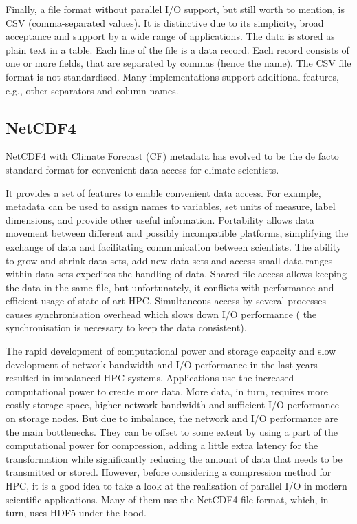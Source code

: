 Finally, a file format without parallel I/O support, but still worth to mention, is CSV (comma-separated values).
It is distinctive due to its simplicity, broad acceptance and support by a wide range of applications.
The data is stored as plain text in a table.
Each line of the file is a data record.
Each record consists of one or more fields, that are separated by commas (hence the name).
The CSV file format is not standardised.
Many implementations support additional features, e.g., other separators and column names.



\subsection{NetCDF4}

NetCDF4 with Climate Forecast (CF) metadata has evolved to be the de facto standard format for convenient data access for climate scientists.

It provides a set of features to enable convenient data access. For example, metadata can be used to assign names to variables, set units of measure, label dimensions, and provide other useful information.
Portability allows data movement between different and possibly incompatible platforms, simplifying the exchange of data and facilitating communication between scientists.
The ability to grow and shrink data sets, add new data sets and access small data ranges within data sets expedites the handling of data.
Shared file access allows keeping the data in the same file, but
unfortunately, it conflicts with performance and efficient usage of state-of-art HPC.
Simultaneous access by several processes causes synchronisation overhead which slows down I/O performance (
the synchronisation is necessary to keep the data consistent).

The rapid development of computational power and storage capacity and slow development of network bandwidth and I/O performance in the last years resulted in imbalanced HPC systems.
Applications use the increased computational power to create more data.
More data, in turn, requires more costly storage space, higher network bandwidth and sufficient I/O performance on storage nodes.
But due to imbalance, the network and I/O performance are the main bottlenecks.
They can be offset to some extent by using a part of the computational power for compression, adding a little extra latency for the transformation while significantly reducing the amount of data that needs to be transmitted or stored.
However, before considering a compression method for HPC, it is a good idea to take a look at the realisation of parallel I/O in modern scientific applications.
Many of them use the NetCDF4 file format, which, in turn, uses HDF5 under the hood.

